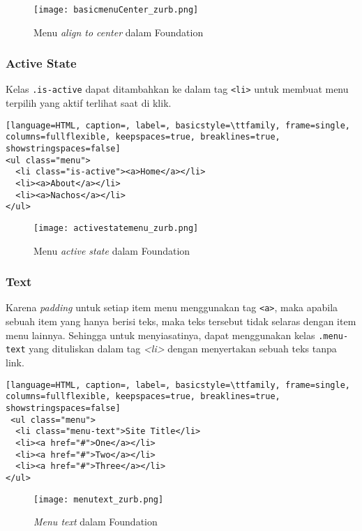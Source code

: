 \begin{figure} [H]
	\centering  
	\texttt{[image: basicmenuCenter\_zurb.png]}  
	\caption{Menu \textit{align to center} dalam Foundation}
\end{figure}

\subsubsection{Active State}
Kelas \texttt{.is-active} dapat ditambahkan ke dalam tag \texttt{<li>} untuk membuat menu terpilih yang aktif terlihat saat di klik. 

\begin{lstlisting}[language=HTML, caption=, label=, basicstyle=\ttfamily, frame=single, columns=fullflexible, keepspaces=true, breaklines=true, showstringspaces=false] 
<ul class="menu">
  <li class="is-active"><a>Home</a></li>
  <li><a>About</a></li>
  <li><a>Nachos</a></li>
</ul>
\end{lstlisting}

\begin{figure} [H]
	\centering  
	\texttt{[image: activestatemenu\_zurb.png]}  
	\caption{Menu \textit{active state} dalam Foundation}
\end{figure}


\subsubsection{Text}
Karena \textit{padding} untuk setiap item menu menggunakan tag \texttt{<a>}, maka apabila sebuah item yang hanya berisi teks, maka teks tersebut tidak selaras dengan item menu lainnya. Sehingga untuk menyiasatinya, dapat menggunakan kelas \texttt{.menu-text} yang dituliskan dalam tag \textit{<li>} dengan menyertakan sebuah teks tanpa link.

\begin{lstlisting}[language=HTML, caption=, label=, basicstyle=\ttfamily, frame=single, columns=fullflexible, keepspaces=true, breaklines=true, showstringspaces=false]
 <ul class="menu">
  <li class="menu-text">Site Title</li>
  <li><a href="#">One</a></li>
  <li><a href="#">Two</a></li>
  <li><a href="#">Three</a></li>
</ul>
\end{lstlisting}

\begin{figure} [H]
	\centering  
	\texttt{[image: menutext\_zurb.png]}  
	\caption{\textit{Menu text} dalam Foundation}
\end{figure}

